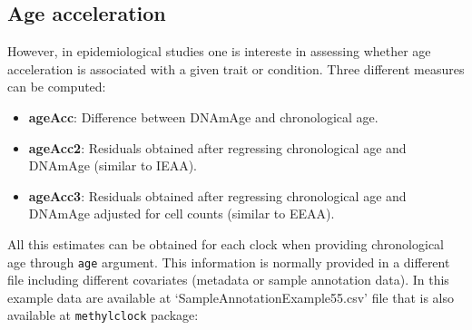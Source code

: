 \documentclass[]{article}
\providecommand{\tightlist}{%
  \setlength{\itemsep}{0pt}\setlength{\parskip}{0pt}}
\begin{document}
\hypertarget{age-acceleration}{%
\subsection{Age acceleration}\label{age-acceleration}}

However, in epidemiological studies one is intereste in assessing whether age acceleration is associated with a given trait or condition. Three different measures can be computed:

\begin{itemize}
\tightlist
\item
  \textbf{ageAcc}: Difference between DNAmAge and chronological age.
\item
  \textbf{ageAcc2}: Residuals obtained after regressing chronological age and DNAmAge (similar to IEAA).
\item
  \textbf{ageAcc3}: Residuals obtained after regressing chronological age and DNAmAge adjusted for cell counts (similar to EEAA).
\end{itemize}

All this estimates can be obtained for each clock when providing chronological age through \texttt{age} argument. This information is normally provided in a different file including different covariates (metadata or sample annotation data). In this example data are available at `SampleAnnotationExample55.csv' file that is also available at \texttt{methylclock} package:
\end{document}
